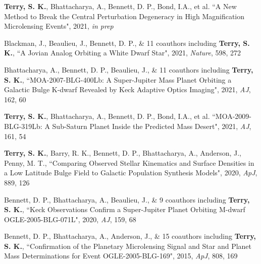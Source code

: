 \documentclass[margin,line]{cv}
\begin{document}
\begin{resume}
\begin{etaremune}
\item \textbf{Terry, S. K.}, Bhattacharya, A., Bennett, D. P., Bond, I.A., et al. ``A New Method to Break the Central Perturbation Degeneracy in High Magnification Microlensing Events", 2021, \textit{in prep}

\item Blackman, J., Beaulieu, J., Bennett, D. P., \& 11 coauthors including {\bf Terry, S. K.}, ``A Jovian Analog Orbiting a White Dwarf Star", 2021, \textit{Nature}, 598, 272

\item Bhattacharya, A., Bennett, D. P., Beaulieu, J., \& 11 coauthors including \textbf{Terry, S. K.}, ``MOA-2007-BLG-400Lb: A Super-Jupiter Mass Planet Orbiting a Galactic Bulge K-dwarf Revealed by Keck Adaptive Optics Imaging", 2021, \textit{AJ}, 162, 60


\item \textbf{Terry, S. K.}, Bhattacharya, A., Bennett, D. P., Bond, I.A., et al. ``MOA-2009-BLG-319Lb: A Sub-Saturn Planet Inside the Predicted Mass Desert", 2021, \textit{AJ}, 161, 54

\item {\bf Terry, S. K.}, Barry, R. K., Bennett, D. P., Bhattacharya, A., Anderson, J., Penny, M. T., ``Comparing Observed Stellar Kinematics and Surface Densities in a Low Latitude Bulge Field to Galactic Population Synthesis Models", 2020, \textit{ApJ}, 889, 126

\item Bennett, D. P., Bhattacharya, A., Beaulieu, J., \& 9 coauthors including {\bf Terry, S. K.}, ``Keck Observations Confirm a Super-Jupiter Planet Orbiting M-dwarf OGLE-2005-BLG-071L", 2020, \textit{AJ}, 159, 68


\item Bennett, D. P., Bhattacharya, A., Anderson, J., \& 15 coauthors including {\bf Terry, S. K.}, ``Confirmation of the Planetary Microlensing Signal and Star and Planet Mass Determinations for Event OGLE-2005-BLG-169", 2015, \textit{ApJ}, 808, 169


\end{etaremune}
\end{resume}
\end{document}
